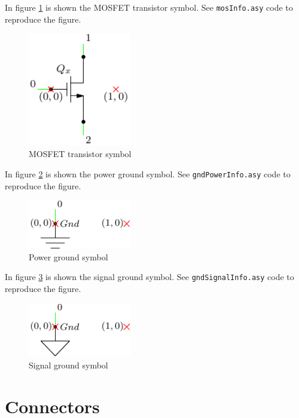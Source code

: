 \documentclass[a4paper,12pt]{report}
\begin{document}
In figure \ref{mosInfo} is shown the MOSFET transistor symbol. See \texttt{mosInfo.asy} code to reproduce the figure.

\begin{figure}[ht]
\centering
\includegraphics[width=0.4\textwidth]{mosInfo}
\caption{MOSFET transistor symbol}
\label{mosInfo}
\end{figure}

In figure \ref{gndPowerInfo} is shown the power ground symbol. See \texttt{gndPowerInfo.asy} code to reproduce the figure.

\begin{figure}[ht]
\centering
\includegraphics[width=0.4\textwidth]{gndPowerInfo}
\caption{Power ground symbol}
\label{gndPowerInfo}
\end{figure}

In figure \ref{gndSignalInfo} is shown the signal ground symbol. See \texttt{gndSignalInfo.asy} code to reproduce the figure.

\begin{figure}[ht]
\centering
\includegraphics[width=0.4\textwidth]{gndSignalInfo}
\caption{Signal ground symbol}
\label{gndSignalInfo}
\end{figure}

\clearpage
\section*{Connectors}
\end{document}

